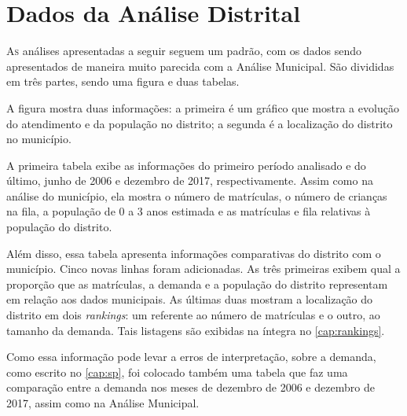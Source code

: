 \chapter{Dados da Análise Distrital}
\label{cap:apendDist}

\lettrine{A}{s} análises apresentadas a seguir seguem um padrão, com os dados sendo apresentados de maneira muito parecida com a Análise Municipal. São divididas em três partes, sendo uma figura e duas tabelas.

A figura mostra duas informações: a primeira é um gráfico que mostra a evolução do atendimento e da população no distrito; a segunda é a localização do distrito no município.

A primeira tabela exibe as informações do primeiro período analisado e do último, junho de 2006 e dezembro de 2017, respectivamente. Assim como na análise do município, ela mostra o número de matrículas, o número de crianças na fila, a população de 0 a 3 anos estimada e as matrículas e fila relativas à população do distrito.

Além disso, essa tabela apresenta informações comparativas do distrito com o município. Cinco novas linhas foram adicionadas. As três primeiras exibem qual a proporção que as matrículas, a demanda e a população do distrito representam em relação aos dados municipais. As últimas duas mostram a localização do distrito em dois \textit{rankings}: um referente ao número de matrículas e o outro, ao tamanho da demanda. Tais listagens são exibidas na íntegra no \autoref{cap:rankings}.

Como essa informação pode levar a erros de interpretação, sobre a demanda, como escrito no \autoref{cap:sp}, foi colocado também uma tabela que faz uma comparação entre a demanda nos meses de dezembro de 2006 e dezembro de 2017, assim como na Análise Municipal.